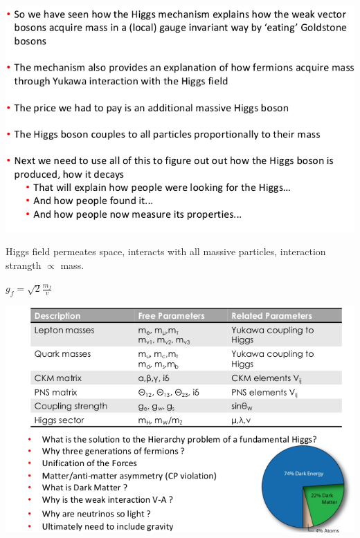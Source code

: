 \begin{center}
    \includegraphics[width=\linewidth]{images/higgs_mechanism_summary.png}
\end{center}

Higgs field permeates space, interacts with all massive particles, interaction strangth $\propto$ mass.

$g_f = \sqrt{2} \frac{m_f}{v}$


\begin{center}
    \includegraphics[width=\linewidth]{images/open_questions.png}
\end{center}
